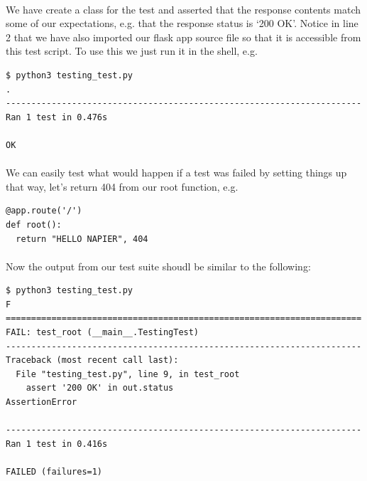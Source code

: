 \documentclass[12pt, a4paper, oneside]{book}
\begin{document}
\paragraph{} We have create a class for the test and asserted that the response contents match some of our expectations, e.g. that the response status is `200 OK'. Notice in line 2 that we have also imported our flask app source file so that it is accessible from this test script. To use this we just run it in the shell, e.g.

\begin{lstlisting}[style=DOS]
$ python3 testing_test.py 
.
----------------------------------------------------------------------
Ran 1 test in 0.476s

OK
\end{lstlisting}
\paragraph{} We can easily test what would happen if a test was failed by setting things up that way, let's return 404 from our root function, e.g.

\begin{lstlisting}
@app.route('/')
def root():
  return "HELLO NAPIER", 404
\end{lstlisting}

\paragraph{} Now the output from our test suite shoudl be similar to the following:

\begin{lstlisting}[style=DOS]
$ python3 testing_test.py 
F
======================================================================
FAIL: test_root (__main__.TestingTest)
----------------------------------------------------------------------
Traceback (most recent call last):
  File "testing_test.py", line 9, in test_root
    assert '200 OK' in out.status
AssertionError

----------------------------------------------------------------------
Ran 1 test in 0.416s

FAILED (failures=1)
\end{lstlisting}
\end{document}
